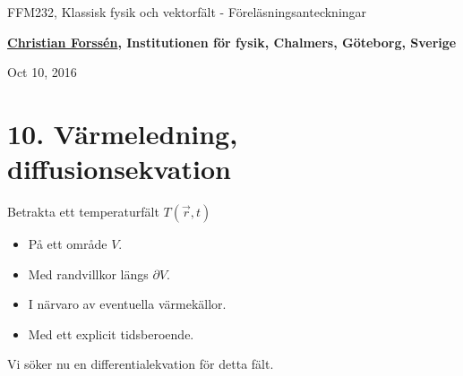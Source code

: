 \documentclass[%
oneside,                 %
final,                   %
10pt]{article}
\begin{document}






\thispagestyle{empty}

\begin{center}
{\LARGE\bf
\begin{spacing}{1.25}
FFM232, Klassisk fysik och vektorfält - Föreläsningsanteckningar
\end{spacing}
}
\end{center}


\begin{center}
{\bf \href{{http://fy.chalmers.se/subatom/tsp/}}{Christian Forssén}, Institutionen för fysik, Chalmers, Göteborg, Sverige${}^{}$} \\ [0mm]
\end{center}

\begin{center}
\end{center}
    

\begin{center}
Oct 10, 2016
\end{center}

\vspace{1cm}


\section{10. Värmeledning, diffusionsekvation}

Betrakta ett temperaturfält $T(\vec{r},t)$
\begin{itemize}
\item På ett område $V$.

\item Med randvillkor längs $\partial V$.

\item I närvaro av eventuella värmekällor.

\item Med ett explicit tidsberoende.
\end{itemize}

\noindent
Vi söker nu en differentialekvation för detta fält.
\end{document}
